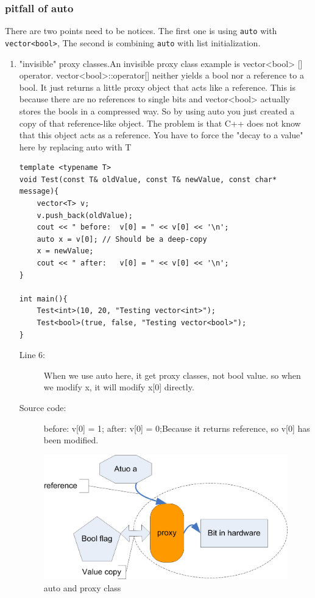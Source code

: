 \documentclass[a4paper,11pt,twoside]{book}
\begin{document}
\subsubsection{pitfall of auto}
	There are two points need to be notices. The first one is using \texttt{auto} with \texttt{vector<bool>}, The second is combining \texttt{auto} with list initialization.
	\begin{enumerate}
		\item "invisible" proxy classes.An invisible proxy class example is vector<bool> [] operator. vector<bool>::operator[] neither yields a bool nor a reference to a bool. It just returns a little proxy object that acts like a reference. This is because there are no references to single bits and vector<bool> actually stores the bools in a compressed way. So by using auto you just created a copy of that reference-like object. The problem is that C++ does not know that this object acts as a reference. You have to force the "decay to a value" here by replacing auto with T
\begin{lstlisting}
template <typename T>
void Test(const T& oldValue, const T& newValue, const char* message){
	vector<T> v;
	v.push_back(oldValue);
	cout << " before:  v[0] = " << v[0] << '\n';
	auto x = v[0]; // Should be a deep-copy
	x = newValue;
	cout << " after:   v[0] = " << v[0] << '\n';
}

int main(){
	Test<int>(10, 20, "Testing vector<int>");
	Test<bool>(true, false, "Testing vector<bool>");
}
\end{lstlisting}
\begin{description}
	\item[Line 6:] When we use auto here, it get proxy classes, not bool value. so when we modify x, it will modify x[0] directly.
	
	\item[Source code:] before:  v[0] = 1; after:   v[0] = 0;Because it returns reference,  so v[0] has been modified.
\end{description}

\begin{figure}[h]
	\centering
	\includegraphics[width=0.6\linewidth]{pics/auto2.png}
	\caption{auto and proxy class}
	\label{fig:auto2}
\end{figure}




\end{enumerate}
\end{document}
